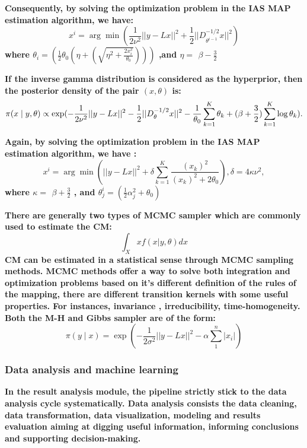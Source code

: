 \documentclass[5p]{elsarticle}
\begin{document}
\begin{frontmatter}
\bf Consequently, by solving the optimization problem in the IAS MAP estimation algorithm, we have:
\begin{equation} 
x^{i}= \arg\min(\frac{1}{2\nu^{2}}||y-L x ||^{2}+\frac{1}{2}||D_{\theta ^{i-1}}^{-1/2} x ||^{2})
\end{equation}
where $\theta_{i}$$=(\frac{1}{2}\theta _{0}(\eta+(\sqrt{\eta^{2}+\frac{2x_{i}^{2}}{\theta_{0}}}))) $ ,and $\eta =$ $\beta -\frac{3}{2} $ 

\bf If the inverse gamma distribution is considered as the hyperprior, then the posterior density of the pair $(x ,\theta )$ is:
\begin{equation} \pi ( x \mid y,\theta ) \propto \exp(-\frac{1}{2\nu^{2}}||y-Lx 
||^{2}\\-\frac{1}{2}||D_{\theta }^{-1/2} x ||^{2}-\frac{1}{\theta 
_{0}}\\\sum_{k=1}^{K}{\theta _{k}}+(\beta +\frac{3}{2})\sum_{k=1}^{K}{\log \theta_{k}}). \end{equation}

\bf Again, by solving the optimization problem in the IAS MAP estimation algorithm, we have :
\begin{equation} x ^{i}=\arg\min(||y-Lx ||^{2}+\delta 
\sum_{k=1}^{K}{\frac{(x _{k})^{2}}{(x _{k})^{2}+2\theta 
_{0}}}), \delta =4\kappa \nu^{2}, \end{equation}
where $\kappa =$ $\beta +\frac{3}{2}$ , and $\theta 
_{j}^{i}=(\frac{1}{2}\alpha _{j}^{2}+\theta _{0}) $

\bf There are generally two types of MCMC sampler which are commonly used to estimate the CM:
\begin{equation} \int_{X}x f(x |y,\theta)dx \end{equation}
\bf CM can be estimated in a statistical sense through MCMC sampling methods.
MCMC methods offer a way to solve both integration and optimization problems based on it’s different definition of the rules of the mapping, there are different transition kernels with some useful properties. For instances,  invariance , irreducibility, time-homogeneity. 
Both the M-H and Gibbs sampler are of the form:
\begin{equation} \pi (y \mid  x  )  = \exp(-\frac{1}{2\sigma ^{2}} ||y-L x ||^{2}-\alpha \sum_{1}^{n}|x_{i}|)
\end{equation}


\subsubsection{Data analysis and machine learning}
\bf In the result analysis module, the pipeline strictly stick to the data analysis cycle systematically. Data analysis consists the data cleaning, data transformation, data visualization, modeling and results evaluation aiming at digging useful information, informing conclusions and supporting decision-making.\cite{16}



\end{frontmatter}
\end{document}
